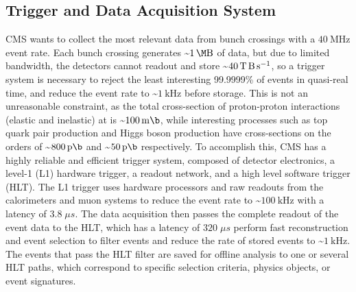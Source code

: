 \subsection{Trigger and Data Acquisition System}
CMS wants to collect the most relevant data from bunch crossings with a $\SI{40}{\MHz}$ event rate.
Each bunch crossing generates \sim$\SI{1}{\M \byte}$ of data, but due to limited bandwidth, the detectors cannot readout and store \sim$\SI{40}{\T \byte \per \s}$, so a trigger system is necessary to reject the least interesting 99.9999\% of events in quasi-real time, and reduce the event rate to \sim$\SI{1}{\kilo \Hz}$ before storage.
This is not an unreasonable constraint, as the total cross-section of proton-proton interactions (elastic and inelastic) at \beamenergy is \sim$\SI{100}{\milli \b}$, while interesting processes such as top quark pair production and Higgs boson production have cross-sections on the orders of \sim$\SI{800}{\pico \b}$ and \sim$\SI{50}{\pico \b}$ respectively.
To accomplish this, CMS has a highly reliable and efficient trigger system, composed of detector electronics, a level-1 (L1) hardware trigger, a readout network, and a high level software trigger (HLT).
The L1 trigger uses hardware processors and raw readouts from the calorimeters and muon systems to reduce the event rate to \sim$\SI{100}{\kHz}$ with a latency of $3.8 \; \mu s$.
The data acquisition then passes the complete readout of the event data to the HLT, which has a latency of $320 \; \mu s$ perform fast reconstruction and event selection to filter events and reduce the rate of stored events to \sim$\SI{1}{\kilo \Hz}$.
The events that pass the HLT filter are saved for offline analysis to one or several HLT paths, which correspond to specific selection criteria, physics objects, or event signatures.



